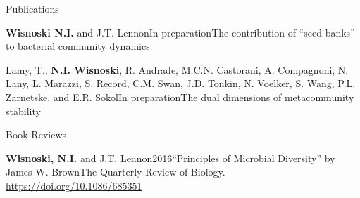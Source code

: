 \documentclass{resume} %
\begin{document}
\begin{rhangSection}{Publications}
\begin{Prep}{{\bf Wisnoski N.I.} and J.T. Lennon}{In preparation}{The contribution of \enquote{seed banks} to bacterial community dynamics}{}
\end{Prep}

\begin{Prep}{Lamy, T., {\bf N.I. Wisnoski}, R. Andrade, M.C.N. Castorani, A. Compagnoni, N. Lany, L. Marazzi, S. Record, C.M. Swan, J.D. Tonkin, N. Voelker, S. Wang, P.L. Zarnetske, and E.R. Sokol}{In preparation}{The dual dimensions of metacommunity stability}{}
\end{Prep}


\end{rhangSection}

\bigskip


\begin{rhangSection}{Book Reviews}

\begin{Publication}{{\bf Wisnoski, N.I.} and J.T. Lennon}{2016}{\enquote{Principles of Microbial Diversity} by James W. Brown}{The Quarterly Review of Biology. \url{https://doi.org/10.1086/685351}}
\end{Publication}

\end{rhangSection}

\bigskip
\end{document}
